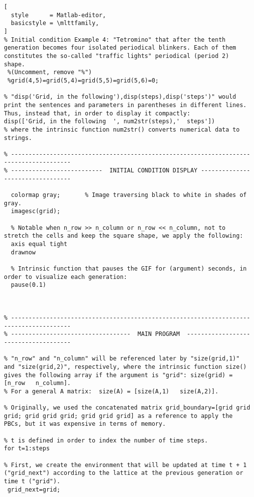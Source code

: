 \documentclass[11pt]{article}
\numberwithin{equation}{section} %
\numberwithin{figure}{section} %
\begin{document}
\begin{appendices}
\begin{lstlisting}[
  style      = Matlab-editor,
  basicstyle = \mlttfamily,
]
% Initial condition Example 4: "Tetromino" that after the tenth generation becomes four isolated periodical blinkers. Each of them constitutes the so-called "traffic lights" periodical (period 2) shape.
 %(Uncomment, remove "%")
 %grid(4,5)=grid(5,4)=grid(5,5)=grid(5,6)=0;
  
% "disp('Grid, in the following'),disp(steps),disp('steps')" would print the sentences and parameters in parentheses in different lines. Thus, instead that, in order to display it compactly:
disp(['Grid, in the following  ', num2str(steps),'  steps'])
% where the intrinsic function num2str() converts numerical data to strings.

% ---------------------------------------------------------------------------------------
% --------------------------  INITIAL CONDITION DISPLAY ---------------------------------
                                          
  colormap gray;       % Image traversing black to white in shades of gray.
  imagesc(grid);  
       
  % Notable when n_row >> n_column or n_row << n_column, not to stretch the cells and keep the square shape, we apply the following:
  axis equal tight     
  drawnow            
  
  % Intrinsic function that pauses the GIF for (argument) seconds, in order to visualize each generation:       
  pause(0.1)  



% ---------------------------------------------------------------------------------------
% ----------------------------------  MAIN PROGRAM  ------------------------------------- 

% "n_row" and "n_column" will be referenced later by "size(grid,1)" and "size(grid,2)", respectively, where the intrinsic function size() gives the following array if the argument is "grid": size(grid) = [n_row   n_column]. 
% For a general A matrix:  size(A) = [size(A,1)   size(A,2)].

% Originally, we used the concatenated matrix grid_boundary=[grid grid grid; grid grid grid; grid grid grid] as a reference to apply the PBCs, but it was expensive in terms of memory.

% t is defined in order to index the number of time steps.
for t=1:steps

% First, we create the environment that will be updated at time t + 1 ("grid_next") according to the lattice at the previous generation or time t ("grid").
 grid_next=grid;
 

\end{lstlisting}
\end{appendices}
\end{document}
